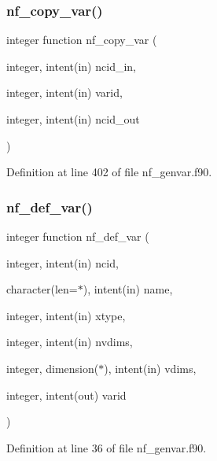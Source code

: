 \subsubsection{\texorpdfstring{nf\+\_\+copy\+\_\+var()}{nf\_copy\_var()}}
{\footnotesize\ttfamily integer function nf\+\_\+copy\+\_\+var (\begin{DoxyParamCaption}\item[{integer, intent(in)}]{ncid\+\_\+in,  }\item[{integer, intent(in)}]{varid,  }\item[{integer, intent(in)}]{ncid\+\_\+out }\end{DoxyParamCaption})}



Definition at line 402 of file nf\+\_\+genvar.\+f90.

\mbox{\label{nf__genvar_8f90_a21a4b1381e03b1ab8477687723bdfb4b}} 
\subsubsection{\texorpdfstring{nf\+\_\+def\+\_\+var()}{nf\_def\_var()}}
{\footnotesize\ttfamily integer function nf\+\_\+def\+\_\+var (\begin{DoxyParamCaption}\item[{integer, intent(in)}]{ncid,  }\item[{character(len=$\ast$), intent(in)}]{name,  }\item[{integer, intent(in)}]{xtype,  }\item[{integer, intent(in)}]{nvdims,  }\item[{integer, dimension($\ast$), intent(in)}]{vdims,  }\item[{integer, intent(out)}]{varid }\end{DoxyParamCaption})}



Definition at line 36 of file nf\+\_\+genvar.\+f90.

\mbox{\label{nf__genvar_8f90_a8e440dd17d73bef324eac899de92b297}} 
